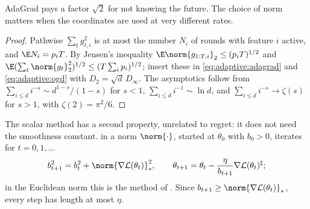 \begin{refsection}
AdaGrad pays a factor $\sqrt2$ for not knowing the future. The choice of norm matters when the coordinates are used at very different rates.


\begin{proof}
Pathwise $\sum_tg_{t,i}^2$ is at most the number $N_i$ of rounds with feature $i$ active, and $\E N_i=p_iT$. By Jensen's inequality $\E\norm{g_{1:T,i}}_2\le(p_iT)^{1/2}$ and $\E(\sum_t\norm{g_t}_2^2)^{1/2}\le(T\sum_ip_i)^{1/2}$; insert these in \eqref{eq:adaptive:adagrad} and \eqref{eq:adaptive:ogd} with $D_2=\sqrt d\,D_\infty$. The asymptotics follow from $\sum_{i\le d}i^{-s}\sim d^{1-s}/(1-s)$ for $s<1$, $\sum_{i\le d}i^{-1}\sim\ln d$, and $\sum_{i\le d}i^{-s}\to\zeta(s)$ for $s>1$, with $\zeta(2)=\pi^2/6$.
\end{proof}

The scalar method has a second property, unrelated to regret: it does not need the smoothness constant.  in a norm $\norm{\cdot}$, started at $\theta_0$ with $b_0>0$, iterates for $t=0,1,\dots$
\begin{equation}\label{eq:adaptive:adagradnorm}
  b_{t+1}^2=b_t^2+\norm{\nabla\Loss(\theta_t)}_*^2,\qquad \theta_{t+1}=\theta_t-\frac{\eta}{b_{t+1}}\nabla\Loss(\theta_t)^\sharp ;
\end{equation}
in the Euclidean norm this is the method of \textcite{WardWuBottou2019}. Since $b_{t+1}\ge\norm{\nabla\Loss(\theta_t)}_*$, every step has length at most $\eta$.


\end{refsection}
